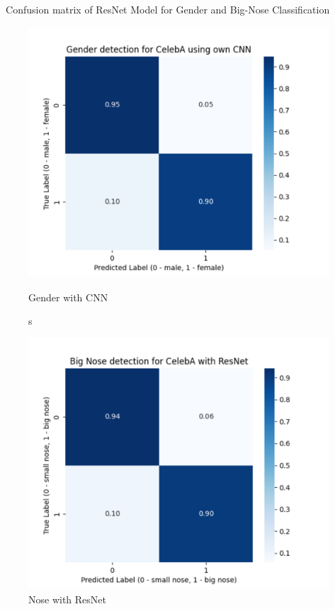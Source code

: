 \documentclass{article}
\begin{document}
\vspace{0.2cm}
\textbf\ Confusion matrix of ResNet Model for Gender and Big-Nose Classification
\begin{figure}[ht]
    \centering
    \begin{minipage}{0.3\linewidth}
        \centering
        \includegraphics[width=\linewidth]{confusion_matrix_celeba_CNN.png}
        \caption{Gender with CNN}
        \label{fig:first}
    \end{minipage}
    \hspace{0.05\linewidth} s
    \begin{minipage}{0.3\linewidth}
        \centering
        \includegraphics[width=\linewidth]{confusion_matrix_celeba_RESNET.png}
        \caption{Nose with ResNet}
        \label{fig:second}
    \end{minipage}
    \label{fig:side-by-side}
\end{figure}
\end{document}
